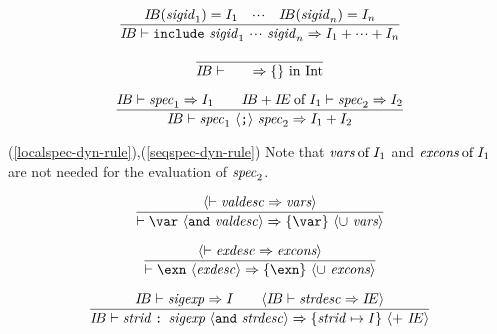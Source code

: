 \begin{equation}        %
\frac{ \IB(\sigid_1)=\I_1 \quad\cdots\quad
       \IB(\sigid_n)=\I_n }
     { \IB\ts\inclspec\ra\I_1 + \cdots +\I_n }
\end{equation}

\begin{equation}        %
\frac{}
     { \IB\ts\emptyspec\ra\emptymap{\rm\ in}\ \Int }
\end{equation}

\begin{equation}        %
\label{seqspec-dyn-rule}
\frac{ \IB\ts\spec_1\ra\I_1
       \qquad \plusmap{\IB}{\of{\IE}{\I_1}}\ts\spec_2\ra\I_2 }
     { \IB\ts\seqspec\ra\plusmap{\I_1}{\I_2} }
\end{equation}
\comments
\begin{description}
\item{(\ref{localspec-dyn-rule}),(\ref{seqspec-dyn-rule})}
  Note that $\mbox{\it vars} \mathbin{\rm of} I_1$ and $\mbox{\it excons} \mathbin{\rm of} I_1$ are
not needed for the evaluation of ${\it spec}_2$.
\end{description}


\begin{equation}         %
\frac{ \langle\ts\valdesc\ra\vars\rangle }
     { \ts\var\ \langle\AND\ \valdesc\rangle\ra
       \{\var\}\ \langle\cup\ \vars\rangle }\index{62.2}
\end{equation}

\begin{equation}         %
\frac{ \langle\ts\exndesc\ra\exns\rangle }
     { \ts\exn\ \langle\exndesc\rangle\ra\{\exn\}\ \langle\cup\ \exns\rangle }\index{62.3}
\end{equation}

\begin{equation}
\frac{ \IB\ts\sigexp\ra\I\qquad\langle\IB\ts\strdesc\ra\IE\rangle }
     { \IB\ts\strdescription\ra\{\strid\mapsto\I\}\ \langle +\ \IE\rangle }\index{62.4}
\end{equation}


